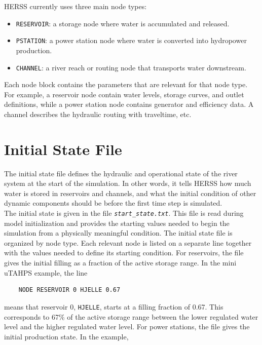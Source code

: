 \documentclass[a4paper, 12pt]{report}
\newcommand{\file}[1]{\textit{\texttt{#1}}}  %
\begin{document}
	HERSS currently uses three main node types:

	\begin{itemize}
		\item \texttt{RESERVOIR}: a storage node where water is accumulated and released.
		\item \texttt{PSTATION}: a power station node where water is converted into hydropower production.
		\item \texttt{CHANNEL}: a river reach or routing node that transports water downstream.
	\end{itemize}

	Each node block contains the parameters that are relevant for that node type. For example, a reservoir node contain water levels, storage curves, and outlet definitions, while a power station node contains generator and efficiency data. A channel describes the hydraulic routing with traveltime, etc. 


   \section{Initial State File}
   
   The initial state file defines the hydraulic and operational state of the river system at the start of the simulation. In other words, it tells HERSS how much water is stored in reservoirs and channels, and what the initial condition of other dynamic components should be before the first time step is simulated. \\
   
   The initial state is given in the file \file{start\_state.txt}. This file is read during model initialization and provides the starting values needed to begin the simulation from a physically meaningful condition. The initial state file is organized by node type. Each relevant node is listed on a separate line together with the values needed to define its starting condition. For reservoirs, the file gives the initial filling as a fraction of the active storage range. In the mini uTAHPS example, the line
   
   \begin{verbatim}
   	NODE RESERVOIR 0 HJELLE 0.67
   \end{verbatim}
   
   \noindent means that reservoir 0, \texttt{HJELLE}, starts at a filling fraction of 0.67. This corresponds to 67\% of the active storage range between the lower regulated water level and the higher regulated water level. For power stations, the file gives the initial production state. In the example,
   
\end{document}
